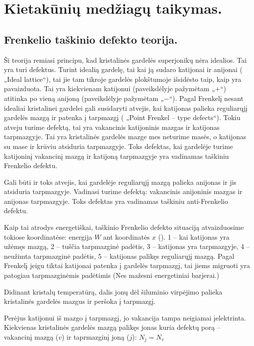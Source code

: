 \chapter{Kietakūnių medžiagų taikymas.}


\section{Frenkelio taškinio defekto teorija.}

Ši teorija remiasi principu, kad kristalinės gardelės superjonikų
nėra idealios. Tai yra turi defektus. Turint idealią gardelę, tai
kai ją sudaro katijonai ir anijonai ( „Ideal lattice“),
tai jie tam tikroje gardelės plokštumoje išsidėsto taip, kaip
yra pavaizduota. Tai yra kiekvienam katijonui (paveikslėlyje pažymėtam
„$+$“) atitinka po vieną anijoną (paveikslėlyje pažymėtam „$-$“).
Pagal Frenkelį nesant idealiai kristalinei gardelei
gali susidaryti atvejis, kai katijonas palieka reguliarųjį gardelės
mazgą ir patenka į tarpmazgį ( „Point Frenkel – type defects“). 
Tokiu atveju turime defektą, tai yra vakancinis katijoninis mazgas
ir katijonas tarpmazgyje. Tai yra kristalinės gardelės mazge mes
neturime masės, o katijonas su mase ir krūviu atsiduria tarpmazgyje.
Toks defektas, kai gardelėje turime katijoninį vakancinį mazgą
ir katijoną tarpmazgyje yra vadinamas taškiniu Frenkelio defektu.

Gali būti ir toks atvejis, kai gardelėje reguliarųjį mazgą palieka
anijonas ir jis atsiduria tarpmazgyje. Vadinasi turime defektą:
vakancinis anijoninis mazgas ir anijonas tarpmazgyje. Toks defektas
yra vadinamas taškiniu anti-Frenkelio defektu.

Kaip tai atrodys energetiškai, taškinio Frenkelio defekto situaciją
atvaizduosime tokiose koordinatėse: energija $W$ ant koordinatės $x$
(). 1 – kai katijonas yra užėmęs mazgą, 2 – tuščia
tarpmazginė padėtis, 3 – katijonas yra tarpmazgyje, 4 – neužimta
tarpmazginė padėtis, 5 – katijonas palikęs reguliarųjį mazgą.
Pagal Frenkelį jeigu tiktai katijonai patenka į gardelės tarpmazgį,
tai jiems migruoti yra patogiau tarpmazginėmis padėtimis (Nes
mažesni energetiniai barjerai.)

Didinant kristalų temperatūrą, dalis jonų dėl šiluminio virpėjimo
palieka kristalinės gardelės mazgus ir peršoka į tarpmazgį.

Perėjus katijonui iš mazgo į tarpmazgį, jo vakancija tampa neigiamai
įelektrinta. Kiekvienas kristalinės gardelės mazgą palikęs jonas
kuria defektų porą – vakancinį mazgą ($v$) ir taprmazginį joną ($j$):
$N_j = N_v$

